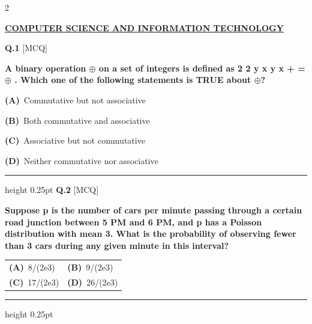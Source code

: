 \documentclass[a4paper,10pt,twoside]{article}
\begin{document}
\begin{multicols}{2}

\vspace{8pt}
\noindent\textbf{\large\underline{COMPUTER SCIENCE AND INFORMATION TECHNOLOGY}}\\[2pt]
\vspace{4pt}

\noindent\textbf{Q.1} \hfill {\footnotesize\textsf{[MCQ]}}
\par\vspace{2pt}
{\bfseries A binary operation $\oplus$ on a set of integers is defined as
2
2
y
x
y
x
+
=
$\oplus$
. Which one of the following
statements is TRUE about $\oplus$? \par}
\par\vspace{2pt}\noindent
\textbf{(A)}~Commutative but not associative\par\vspace{2pt}\noindent
\textbf{(B)}~Both commutative and associative\par\vspace{2pt}\noindent
\textbf{(C)}~Associative but not commutative\par\vspace{2pt}\noindent
\textbf{(D)}~Neither commutative nor associative
\par\vspace{6pt}\hrule height 0.25pt\vspace{6pt}
\noindent\textbf{Q.2} \hfill {\footnotesize\textsf{[MCQ]}}
\par\vspace{2pt}
{\bfseries Suppose p is the number of cars per minute passing through a certain road junction between 5 PM
and 6 PM, and p has a Poisson distribution with mean 3. What is the probability of observing fewer
than 3 cars during any given minute in this interval? \par}
\par\vspace{2pt}\noindent
\begin{tabular*}{\columnwidth}{@{\extracolsep{\fill}}p{}p{}@{}}
\textbf{(A)}~8/(2e3) & \textbf{(B)}~9/(2e3) \\
\addlinespace[2pt]
\textbf{(C)}~17/(2e3) & \textbf{(D)}~26/(2e3)
\end{tabular*}
\par\vspace{6pt}\hrule height 0.25pt\vspace{6pt}

\end{multicols}
\end{document}
